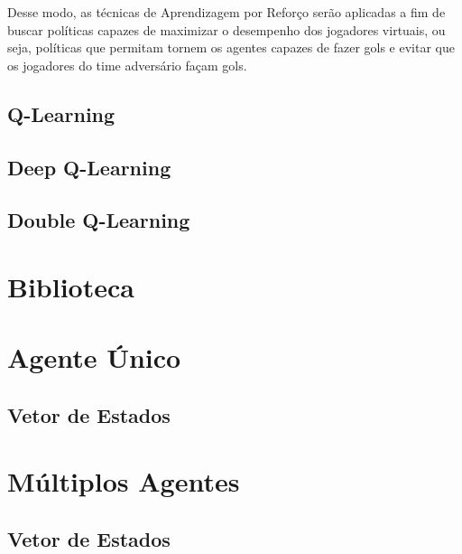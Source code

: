 Desse modo, as técnicas de Aprendizagem por Reforço serão aplicadas a fim de buscar políticas capazes de maximizar o desempenho dos jogadores virtuais, ou seja, políticas que permitam tornem os agentes capazes de fazer gols e evitar que os jogadores do time adversário façam gols.

\subsection{Q-Learning}

\subsection{Deep Q-Learning}

\subsection{Double Q-Learning}

\section{Biblioteca}

\section{Agente Único}

\subsection{Vetor de Estados}

\section{Múltiplos Agentes}

\subsection{Vetor de Estados}


